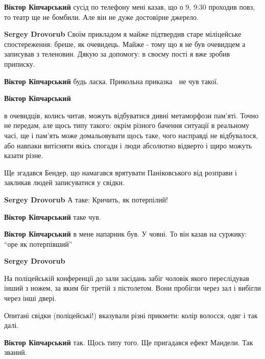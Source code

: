 \begin{itemize}
\textbf{Віктор Кіпчарський} сусід по телефону мені казав, що о 9, 9:30 проходив повз, то театр ще не бомбили. Але він не дуже достовірне джерело.

\textbf{Sergey Drovorub} Своїм прикладом я майже підтвердив старе міліцейське спостереження: бреше, як очевидець.
Майже - тому що я не був очевидцем а записував з теленовин.
Дякую за допомогу: в своєму пості я вже зробив приписку.

\textbf{Віктор Кіпчарський} будь ласка.
Прикольна приказка 🙂 не чув такої.

\textbf{Віктор Кіпчарський} 

в очевидців, колись читав, можуть відбуватися дивні метаморфози пам'яті. Точно
не передам, але щось типу такого: окрім різного бачення ситуації в реальному
часі, ще і пам'ять може домальовувати щось таке, чого насправді не відбувалося,
або навпаки витісняти якісь спогади і люди абсолютно відверто і щиро можуть
казати різне.

Ще згадався Бендер, що намагався врятувати Паніковського від розправи і
закликав людей записуватися у свідки. 🙂

\textbf{Sergey Drovorub} А таке:
Кричить, як потерпілий!

\textbf{Віктор Кіпчарський} таке чув.

\textbf{Віктор Кіпчарський} в мене напарник був. У човні. То він казав на суржику: \enquote{оре як потерпівший} 🙂

\textbf{Sergey Drovorub} 

На поліцейській конференції до зали засідань забіг чоловік якого переслідував
інший з ножем, за яким біг третій з пістолетом. Вони пробігли через зал і
вибігли через інші двері.

Опитані свідки (поліцейські!) вказували різні прикмети: колір волосся, одяг і так далі.

\textbf{Віктор Кіпчарський} так. Щось типу того. Ще пригадався ефект Мандели. Так званий.

\end{itemize} %
